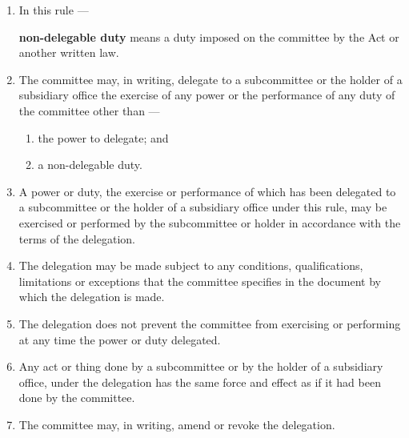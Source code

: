 \documentclass[../constitution.tex]{subfiles}
\begin{document}
\begin{enumerate}

  \item In this rule ---

        \textbf{non-delegable duty} means a duty imposed on the committee by the Act or another written law.

  \item The committee may, in writing, delegate to a subcommittee or the holder of a subsidiary office the exercise of any power or the performance of any duty of the committee other than ---

        \begin{enumerate}

          \item the power to delegate; and
          \item a non-delegable duty.
        \end{enumerate}
  \item A power or duty, the exercise or performance of which has been delegated to a subcommittee or the holder of a subsidiary office under this rule, may be exercised or performed by the subcommittee or holder in accordance with the terms of the delegation.
  \item The delegation may be made subject to any conditions, qualifications, limitations or exceptions that the committee specifies in the document by which the delegation is made.
  \item The delegation does not prevent the committee from exercising or performing at any time the power or duty delegated.
  \item Any act or thing done by a subcommittee or by the holder of a subsidiary office, under the delegation has the same force and effect as if it had been done by the committee.
  \item The committee may, in writing, amend or revoke the delegation.
\end{enumerate}
\end{document}
